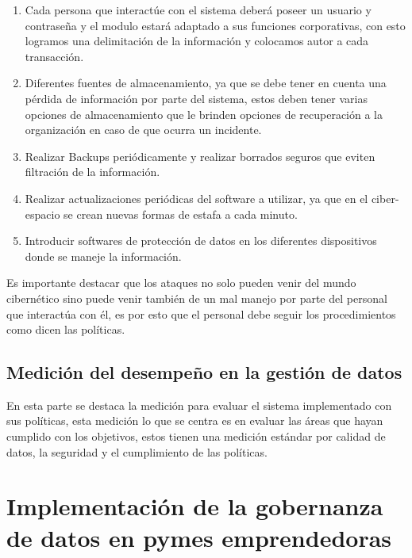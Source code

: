 \documentclass[
  letterpaper,
  DIV=11,
  numbers=noendperiod]{scrreprt}
\providecommand{\tightlist}{%
  \setlength{\itemsep}{0pt}\setlength{\parskip}{0pt}}\usepackage{longtable,booktabs,array}
\begin{document}
\begin{enumerate}
\def\labelenumi{\arabic{enumi}.}
\tightlist
\item
  Cada persona que interactúe con el sistema deberá poseer un usuario y
  contraseña y el modulo estará adaptado a sus funciones corporativas,
  con esto logramos una delimitación de la información y colocamos autor
  a cada transacción.
\item
  Diferentes fuentes de almacenamiento, ya que se debe tener en cuenta
  una pérdida de información por parte del sistema, estos deben tener
  varias opciones de almacenamiento que le brinden opciones de
  recuperación a la organización en caso de que ocurra un incidente.
\item
  Realizar Backups periódicamente y realizar borrados seguros que eviten
  filtración de la información.
\item
  Realizar actualizaciones periódicas del software a utilizar, ya que en
  el ciber-espacio se crean nuevas formas de estafa a cada minuto.
\item
  Introducir softwares de protección de datos en los diferentes
  dispositivos donde se maneje la información.
\end{enumerate}

Es importante destacar que los ataques no solo pueden venir del mundo
cibernético sino puede venir también de un mal manejo por parte del
personal que interactúa con él, es por esto que el personal debe seguir
los procedimientos como dicen las políticas.

\hypertarget{mediciuxf3n-del-desempeuxf1o-en-la-gestiuxf3n-de-datos}{%
\section{Medición del desempeño en la gestión de
datos}\label{mediciuxf3n-del-desempeuxf1o-en-la-gestiuxf3n-de-datos}}

En esta parte se destaca la medición para evaluar el sistema
implementado con sus políticas, esta medición lo que se centra es en
evaluar las áreas que hayan cumplido con los objetivos, estos tienen una
medición estándar por calidad de datos, la seguridad y el cumplimiento
de las políticas.


\hypertarget{implementaciuxf3n-de-la-gobernanza-de-datos-en-pymes-emprendedoras}{%
\chapter{Implementación de la gobernanza de datos en pymes
emprendedoras}\label{implementaciuxf3n-de-la-gobernanza-de-datos-en-pymes-emprendedoras}}
\end{document}
